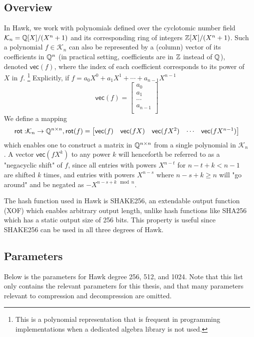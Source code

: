 \subsection{Overview}
In Hawk, we work with polynomials defined over the cyclotomic number field $\mathcal{K}_n = \mathbb{Q}[X]/(X^n +1)$ and its corresponding ring of integers
$\mathbb{Z}[X] / (X^n + 1)$. Such a polynomial $f \in \mathcal{K}_n$ can also be represented by a (column) vector of its coefficients in $\mathbb{Q}^n$ (in practical setting, coefficients are in $\mathbb{Z}$ instead of $\mathbb{Q}$), 
denoted $\mathsf{vec}(f)$, where the index of each coefficient corresponds to its power of $X$ in $f$. 
\footnote{This is a polynomial representation that is frequent in programming implementations when a dedicated algebra library is not used.}
Explicitly, if $f = a_0 X^0 + a_1 X^1 + \cdots + a_{n-1} X^{n-1}$
\[
    \mathsf{vec}(f) = 
    \begin{bmatrix}
        a_0 \\
        a_1 \\
        \cdots \\
        a_{n-1} \\
    \end{bmatrix}
\] 
We define a mapping 
\[\mathsf{rot:} \mathcal{K}_n \rightarrow \mathbb{Q}^{n \times n}, \mathsf{rot}(f) = 
\begin{bmatrix} 
    \mathsf{vec}(f) & \mathsf{vec}(fX) & \mathsf{vec}(fX^2) & \cdots & \mathsf{vec}(fX^{n-1})
\end{bmatrix}    
\]
which enables one to construct a matrix in $\mathbb{Q}^{n \times n}$ from a single polynomial in $\mathcal{K}_n$. A vector $\mathsf{vec}(fX^k)$ to any power $k$ will 
henceforth be referred to as a "negacyclic shift" of $f$, since all entries with powers $X^{n-t}$ for $n-t + k  < n-1$ are shifted $k$ times, 
and entries with powers $X^{n-s}$ where $n-s + k \geq n$ will "go around" and be negated as $- X^{n-s +k \mod n}$.

The hash function used in Hawk is SHAKE256, an extendable output function (XOF) which enables arbitrary output length, unlike hash functions like SHA256 which 
has a static output size of 256 bits. This property is useful since SHAKE256 can be used in all three degrees of Hawk.

\subsection{Parameters}
Below is the parameters for Hawk degree 256, 512, and 1024. Note that this list only contains the relevant parameters for this thesis, and that many parameters relevant to 
compression and decompression are omitted.


